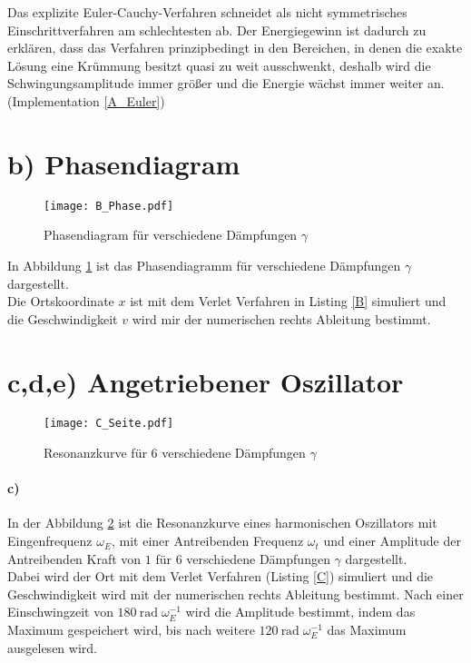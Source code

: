Das explizite Euler-Cauchy-Verfahren schneidet als nicht symmetrisches Einschrittverfahren am schlechtesten ab. Der \grqq{}Energiegewinn\grqq{} ist dadurch zu erklären, dass das Verfahren prinzipbedingt in den Bereichen, in denen die exakte Lösung eine Krümmung besitzt quasi zu weit ausschwenkt, deshalb wird die Schwingungsamplitude immer größer und die Energie wächst immer weiter an. (Implementation \ref{A_Euler})


\section*{b) Phasendiagram}
\begin{figure}[h!]
	\centering
	\texttt{[image: B\_Phase.pdf]}
	\caption{Phasendiagram für verschiedene Dämpfungen $\gamma$}
	\label{fig:phase}
\end{figure}
In Abbildung \ref{fig:phase} ist das Phasendiagramm für verschiedene Dämpfungen $\gamma$ dargestellt.\\
Die Ortskoordinate $x$ ist mit dem Verlet Verfahren in Listing \ref{B} simuliert und die Geschwindigkeit $v$ wird mir der numerischen rechts Ableitung bestimmt.

\section*{c,d,e) Angetriebener Oszillator}
\begin{figure}[t]
	\centering
	\texttt{[image: C\_Seite.pdf]}
	\caption{Resonanzkurve für 6 verschiedene Dämpfungen $\gamma$}
	\label{fig:seite}
\end{figure}

\paragraph*{c)} In der Abbildung \ref{fig:seite} ist die Resonanzkurve eines harmonischen Oszillators mit Eingenfrequenz $\omega_E$, mit einer Antreibenden Frequenz $\omega_t$ und einer Amplitude der Antreibenden Kraft von $1$ für 6 verschiedene Dämpfungen $\gamma$  dargestellt.\\ 
Dabei wird der Ort mit dem Verlet Verfahren (Listing \ref{C}) simuliert und die Geschwindigkeit wird mit der numerischen rechts Ableitung bestimmt.
Nach einer Einschwingzeit von $\SI{180}{\radian}\;\omega_E^{-1}$ wird die Amplitude bestimmt, indem das Maximum gespeichert wird, bis nach weitere $\SI{120}{\radian}\;\omega_E^{-1}$ das Maximum ausgelesen wird. 

